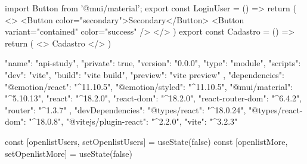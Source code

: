 import { Button } from '@mui/material';
export const LoginUser = () => {
    return (
        <>
            <Button color="secondary">Secondary</Button>
            <Button variant="contained" color="success" />
        </>
    )
}
export const Cadastro = () => {
    return (
        <>
            Cadastro
        </>
    )
}


{
  "name": "api-study",
  "private": true,
  "version": "0.0.0",
  "type": "module",
  "scripts": {
    "dev": "vite",
    "build": "vite build",
    "preview": "vite preview"
  },
  "dependencies": {
    "@emotion/react": "^11.10.5",
    "@emotion/styled": "^11.10.5",
    "@mui/material": "^5.10.13",
    "react": "^18.2.0",
    "react-dom": "^18.2.0",
    "react-router-dom": "^6.4.2",
    "router": "^1.3.7"
  },
  "devDependencies": {
    "@types/react": "^18.0.24",
    "@types/react-dom": "^18.0.8",
    "@vitejs/plugin-react": "^2.2.0",
    "vite": "^3.2.3"
  }
}

const [openlistUsers, setOpenlistUsers] = useState(false)
const [openlistMore, setOpenlistMore] = useState(false)

    